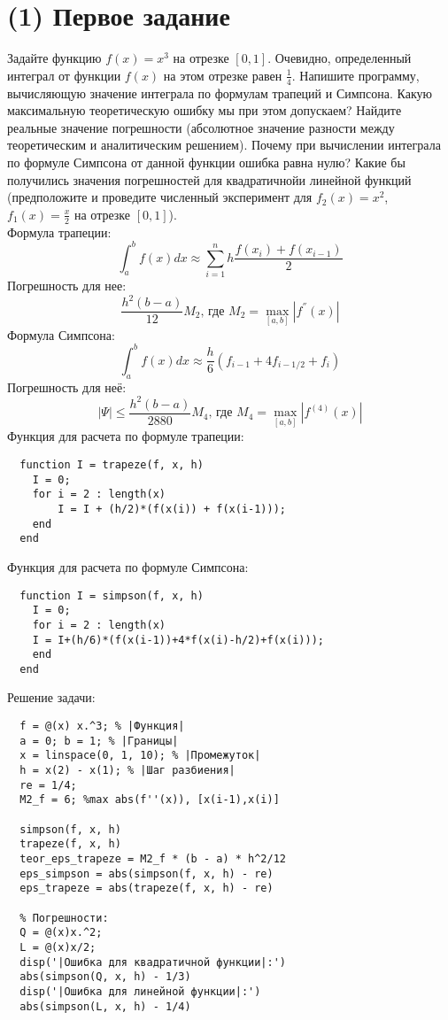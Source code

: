 \tableofcontents
\newpage
\section{(1) Первое задание}
Задайте функцию $f(x) = x^{3}$ на отрезке $[0, 1]$. Очевидно, определенный интеграл от функции $f(x)$ на этом отрезке равен $\frac{1}{4}$. Напишите программу, вычисляющую значение интеграла по формулам трапеций и Симпсона. Какую максимальную теоретическую ошибку мы при этом допускаем? Найдите реальные значение погрешности (абсолютное значение разности между теоретическим и аналитическим решением). Почему при вычислении интеграла по формуле Симпсона от данной функции ошибка равна нулю? Какие бы получились значения погрешностей для квадратичнойи линейной функций (предположите и проведите численный эксперимент для $f_{2}(x) = x^{2}$, $f_{1}(x) = \frac{x}{2}$ на отрезке $[0, 1]$).\\[2mm]

Формула трапеции:
\[
  \int_{a}^{b} f(x)dx \approx \sum_{i=1}^{n }h\frac{f(x_{i}) + f(x_{i-1})}{2}
\]
Погрешность для нее:
\[
  \frac{h^{2}(b-a)}{12}M_{2}\text{, где } M_{2} = \max_{[a,b]}|f^{''}(x)|
\]
Формула Симпсона:
\[
  \int_{a}^{b} f(x)dx \approx \frac{h}{6}(f_{i-1} + 4f_{i-1/2} + f_{i})
\]
Погрешность для неё:
\[
  |\Psi| \leq \frac{h^{2}(b-a)}{2880}M_{4} \text{, где } M_{4} = \max_{[a,b]}|f^{(4)}(x)|
\]
Функция для расчета по формуле трапеции:
\begin{lstlisting}
  function I = trapeze(f, x, h)
    I = 0;
    for i = 2 : length(x)
        I = I + (h/2)*(f(x(i)) + f(x(i-1)));
    end
  end
\end{lstlisting}

Функция для расчета по формуле Симпсона:
\begin{lstlisting}
  function I = simpson(f, x, h)
    I = 0;
    for i = 2 : length(x)
    I = I+(h/6)*(f(x(i-1))+4*f(x(i)-h/2)+f(x(i)));
    end
  end
\end{lstlisting}
Решение задачи:
\begin{lstlisting}
  f = @(x) x.^3; % |Функция|
  a = 0; b = 1; % |Границы|
  x = linspace(0, 1, 10); % |Промежуток|
  h = x(2) - x(1); % |Шаг разбиения|
  re = 1/4;
  M2_f = 6; %max abs(f''(x)), [x(i-1),x(i)]

  simpson(f, x, h)
  trapeze(f, x, h)
  teor_eps_trapeze = M2_f * (b - a) * h^2/12
  eps_simpson = abs(simpson(f, x, h) - re)
  eps_trapeze = abs(trapeze(f, x, h) - re)

  % Погрешности:
  Q = @(x)x.^2;
  L = @(x)x/2;
  disp('|Ошибка для квадратичной функции|:')
  abs(simpson(Q, x, h) - 1/3)
  disp('|Ошибка для линейной функции|:')
  abs(simpson(L, x, h) - 1/4)
\end{lstlisting}

